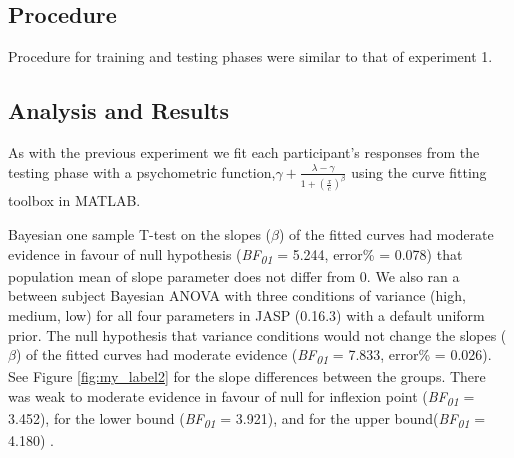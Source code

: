 \documentclass[10pt,letterpaper]{article}
\begin{document}
\subsection{Procedure}
Procedure for training and testing phases were similar to that of experiment 1.	

\subsection{Analysis and Results}
As with the previous experiment we fit each participant's responses from the testing phase with  a psychometric function,$\gamma +\frac{\lambda - \gamma }{1 + (\frac{x}{c})^{\beta}}$ using the curve fitting toolbox in MATLAB. 



Bayesian one sample T-test on the slopes ($\beta$) of the fitted curves had moderate evidence in favour of null hypothesis (\textit{BF\textsubscript{01}} = 5.244, error\% = 0.078) that population mean of slope parameter does not differ from 0. We also ran a between subject Bayesian ANOVA with three conditions of variance (high, medium, low) for all four parameters in JASP (0.16.3) with a default uniform prior. The null hypothesis that variance conditions would not change the slopes ($\beta$) of the fitted curves had moderate evidence (\textit{BF\textsubscript{01}} = 7.833, error\% = 0.026). See Figure \ref{fig:my_label2} for the slope differences between the groups. There was weak to moderate evidence in favour of null for inflexion point (\textit{BF\textsubscript{01}} = 3.452), for the lower bound (\textit{BF\textsubscript{01}} = 3.921), and for the upper bound(\textit{BF\textsubscript{01}} = 4.180) .
\end{document}
